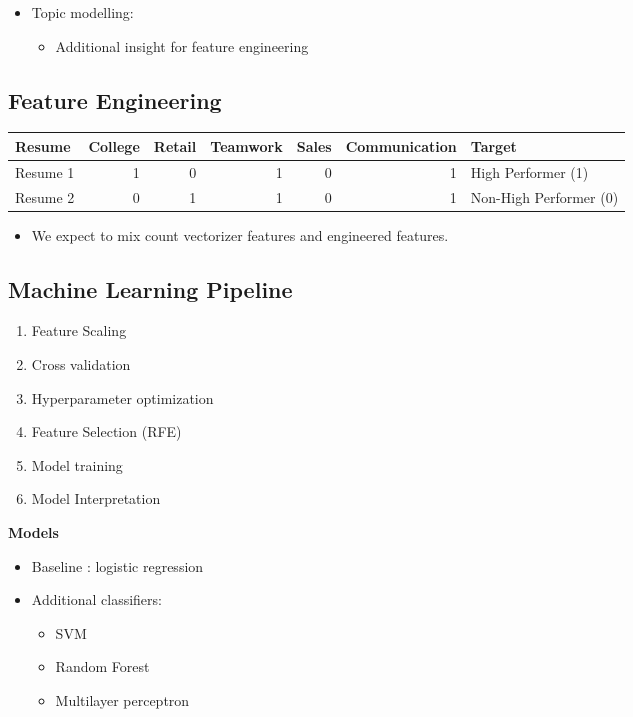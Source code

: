 \documentclass[
]{article}
\providecommand{\tightlist}{%
  \setlength{\itemsep}{0pt}\setlength{\parskip}{0pt}}
\begin{document}
\begin{itemize}
\tightlist
\item
  Topic modelling:

  \begin{itemize}
  \tightlist
  \item
    Additional insight for feature engineering
  \end{itemize}
\end{itemize}

\hypertarget{feature-engineering}{%
\subsection{Feature Engineering}\label{feature-engineering}}

\begin{longtable}[]{@{}lrrrrrl@{}}
\toprule
Resume & College & Retail & Teamwork & Sales & Communication &
Target\tabularnewline
\midrule
\endhead
Resume 1 & 1 & 0 & 1 & 0 & 1 & High Performer (1)\tabularnewline
Resume 2 & 0 & 1 & 1 & 0 & 1 & Non-High Performer (0)\tabularnewline
\bottomrule
\end{longtable}

\begin{itemize}
\tightlist
\item
  We expect to mix count vectorizer features and engineered features.
\end{itemize}

\hypertarget{machine-learning-pipeline}{%
\subsection{Machine Learning Pipeline}\label{machine-learning-pipeline}}

\begin{enumerate}
\def\labelenumi{\arabic{enumi}.}
\tightlist
\item
  Feature Scaling
\item
  Cross validation
\item
  Hyperparameter optimization
\item
  Feature Selection (RFE)
\item
  Model training
\item
  Model Interpretation
\end{enumerate}

\textbf{Models}

\begin{itemize}
\tightlist
\item
  Baseline : logistic regression
\item
  Additional classifiers:

  \begin{itemize}
  \tightlist
  \item
    SVM
  \item
    Random Forest
  \item
    Multilayer perceptron
  \end{itemize}
\end{itemize}
\end{document}
